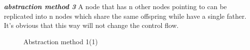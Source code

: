 \documentclass[12pt]{article}
\begin{document}
    \textit{\textbf{abstraction method 3}} A node that has n other nodes pointing to can be replicated into n nodes which share the same offspring while have a single father. It's obvious that this way will not change the control flow.\\

\begin{figure}
\begin{center}
\begin{minipage}[c]{0.5\textwidth}
\centering
{}
\renewcommand{\figurename}{Figure}
\caption{Abstraction method 1(1) }
\label{}
\end{minipage}%
\begin{minipage}[c]{0.5\textwidth}
\centering
{}

\end{minipage}
\end{center}
\end{figure}
\end{document}
